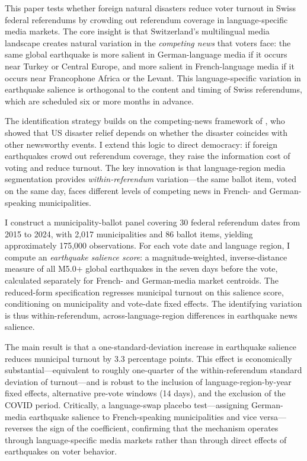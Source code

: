 \documentclass[12pt]{article}
\begin{document}
This paper tests whether foreign natural disasters reduce voter turnout in Swiss federal referendums by crowding out referendum coverage in language-specific media markets. The core insight is that Switzerland's multilingual media landscape creates natural variation in the \emph{competing news} that voters face: the same global earthquake is more salient in German-language media if it occurs near Turkey or Central Europe, and more salient in French-language media if it occurs near Francophone Africa or the Levant. This language-specific variation in earthquake salience is orthogonal to the content and timing of Swiss referendums, which are scheduled six or more months in advance.

The identification strategy builds on the competing-news framework of \citet{eisensee2007news}, who showed that US disaster relief depends on whether the disaster coincides with other newsworthy events. I extend this logic to direct democracy: if foreign earthquakes crowd out referendum coverage, they raise the information cost of voting and reduce turnout. The key innovation is that language-region media segmentation provides \emph{within-referendum} variation---the same ballot item, voted on the same day, faces different levels of competing news in French- and German-speaking municipalities.

I construct a municipality-ballot panel covering 30 federal referendum dates from 2015 to 2024, with 2,017 municipalities and 86 ballot items, yielding approximately 175,000 observations. For each vote date and language region, I compute an \emph{earthquake salience score}: a magnitude-weighted, inverse-distance measure of all M5.0+ global earthquakes in the seven days before the vote, calculated separately for French- and German-media market centroids. The reduced-form specification regresses municipal turnout on this salience score, conditioning on municipality and vote-date fixed effects. The identifying variation is thus within-referendum, across-language-region differences in earthquake news salience.

The main result is that a one-standard-deviation increase in earthquake salience reduces municipal turnout by 3.3 percentage points. This effect is economically substantial---equivalent to roughly one-quarter of the within-referendum standard deviation of turnout---and is robust to the inclusion of language-region-by-year fixed effects, alternative pre-vote windows (14 days), and the exclusion of the COVID period. Critically, a language-swap placebo test---assigning German-media earthquake salience to French-speaking municipalities and vice versa---reverses the sign of the coefficient, confirming that the mechanism operates through language-specific media markets rather than through direct effects of earthquakes on voter behavior.
\end{document}
